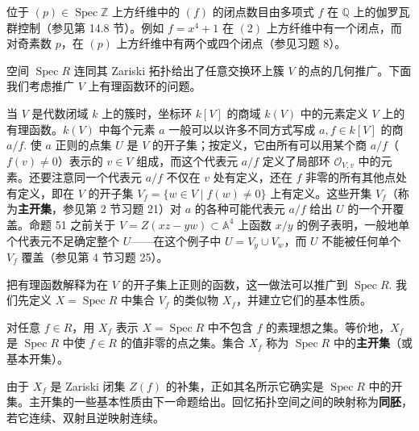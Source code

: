 位于 \((p) \in \operatorname{Spec}\mathbb{Z}\) 上方纤维中的 \((f)\) 的闭点数目由多项式 \(f\) 在 \(\mathbb{Q}\) 上的伽罗瓦群控制（参见第 14.8 节）。例如 \(f = x^4+1\) 在 \((2)\) 上方纤维中有一个闭点，而对奇素数 \(p\)，在 \((p)\) 上方纤维中有两个或四个闭点（参见习题 8）。

空间 \(\operatorname{Spec}R\) 连同其 Zariski 拓扑给出了任意交换环上簇 \(V\) 的点的几何推广。下面我们考虑推广 \(V\) 上有理函数环的问题。

当 \(V\) 是代数闭域 \(k\) 上的簇时，坐标环 \(k[V]\) 的商域 \(k(V)\) 中的元素定义 \(V\) 上的有理函数。\(k(V)\) 中每个元素 \(a\) 一般可以以许多不同方式写成 \(a, f \in k[V]\) 的商 \(a/f\). 使 \(a\) 正则的点集 \(U\) 是 \(V\) 的开子集；按定义，它由所有可以用某个商 \(a/f\)（\(f(v) \neq 0\)）表示的 \(v \in V\) 组成，而这个代表元 \(a/f\) 定义了局部环 \(\mathcal{O}_{V,v}\) 中的元素。还要注意同一个代表元 \(a/f\) 不仅在 \(v\) 处有定义，还在 \(f\) 非零的所有其他点处有定义，即在 \(V\) 的开子集 \(V_f = \{w \in V \mid f(w) \neq 0\}\) 上有定义。这些开集 \(V_f\)（称为\textbf{主开集}，参见第 2 节习题 21）对 \(a\) 的各种可能代表元 \(a/f\) 给出 \(U\) 的一个开覆盖。命题 51 之前关于 \(V = Z(xz-yw) \subset \mathbb{A}^4\) 上函数 \(x/y\) 的例子表明，一般地单个代表元不足确定整个 \(U\)——在这个例子中 \(U = V_y \cup V_w\)，而 \(U\) 不能被任何单个 \(V_f\) 覆盖（参见第 4 节习题 25）。

把有理函数解释为在 \(V\) 的开子集上正则的函数，这一做法可以推广到 \(\operatorname{Spec}R\). 我们先定义 \(X = \operatorname{Spec}R\) 中集合 \(V_f\) 的类似物 \(X_f\)，并建立它们的基本性质。

\begin{definition}
对任意 \(f \in R\)，用 \(X_f\) 表示 \(X = \operatorname{Spec}R\) 中不包含 \(f\) 的素理想之集。等价地，\(X_f\) 是 \(\operatorname{Spec}R\) 中使 \(f \in R\) 的值非零的点之集。集合 \(X_f\) 称为 \(\operatorname{Spec}R\) 中的\textbf{主开集}（或基本开集）。
\end{definition}

由于 \(X_f\) 是 Zariski 闭集 \(Z(f)\) 的补集，正如其名所示它确实是 \(\operatorname{Spec}R\) 中的开集。主开集的一些基本性质由下一命题给出。回忆拓扑空间之间的映射称为\textbf{同胚}，若它连续、双射且逆映射连续。

